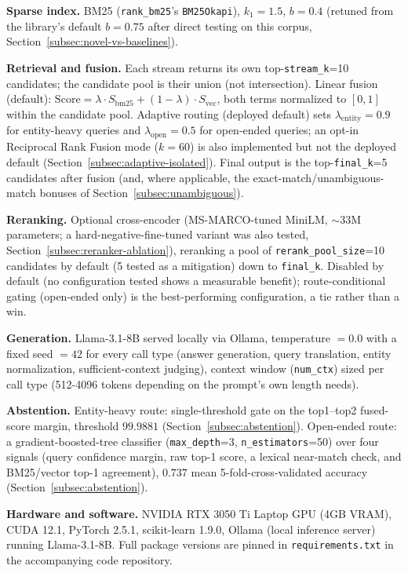 \documentclass[a4paper,twoside]{article}
\begin{document}
\textbf{Sparse index.} BM25 (\texttt{rank\_bm25}'s \texttt{BM25Okapi}), $k_1=1.5$, $b=0.4$ (retuned from the library's default $b=0.75$ after direct testing on this corpus, Section~\ref{subsec:novel-vs-baselines}).

\textbf{Retrieval and fusion.} Each stream returns its own top-\texttt{stream\_k}=10 candidates; the candidate pool is their union (not intersection). Linear fusion (default): $\mathrm{Score} = \lambda \cdot S_{\mathrm{bm25}} + (1-\lambda) \cdot S_{\mathrm{vec}}$, both terms normalized to $[0,1]$ within the candidate pool. Adaptive routing (deployed default) sets $\lambda_{\mathrm{entity}}=0.9$ for entity-heavy queries and $\lambda_{\mathrm{open}}=0.5$ for open-ended queries; an opt-in Reciprocal Rank Fusion mode ($k=60$) is also implemented but not the deployed default (Section~\ref{subsec:adaptive-isolated}). Final output is the top-\texttt{final\_k}=5 candidates after fusion (and, where applicable, the exact-match/unambiguous-match bonuses of Section~\ref{subsec:unambiguous}).

\textbf{Reranking.} Optional cross-encoder (MS-MARCO-tuned MiniLM, $\sim$33M parameters; a hard-negative-fine-tuned variant was also tested, Section~\ref{subsec:reranker-ablation}), reranking a pool of \texttt{rerank\_pool\_size}=10 candidates by default (5 tested as a mitigation) down to \texttt{final\_k}. Disabled by default (no configuration tested shows a measurable benefit); route-conditional gating (open-ended only) is the best-performing configuration, a tie rather than a win.

\textbf{Generation.} Llama-3.1-8B served locally via Ollama, temperature $=0.0$ with a fixed seed $=42$ for every call type (answer generation, query translation, entity normalization, sufficient-context judging), context window (\texttt{num\_ctx}) sized per call type (512-4096 tokens depending on the prompt's own length needs).

\textbf{Abstention.} Entity-heavy route: single-threshold gate on the top1--top2 fused-score margin, threshold $99.9881$ (Section~\ref{subsec:abstention}). Open-ended route: a gradient-boosted-tree classifier (\texttt{max\_depth}=3, \texttt{n\_estimators}=50) over four signals (query confidence margin, raw top-1 score, a lexical near-match check, and BM25/vector top-1 agreement), $0.737$ mean 5-fold-cross-validated accuracy (Section~\ref{subsec:abstention}).

\textbf{Hardware and software.} NVIDIA RTX 3050 Ti Laptop GPU (4GB VRAM), CUDA 12.1, PyTorch 2.5.1, scikit-learn 1.9.0, Ollama (local inference server) running Llama-3.1-8B. Full package versions are pinned in \texttt{requirements.txt} in the accompanying code repository.
\end{document}
